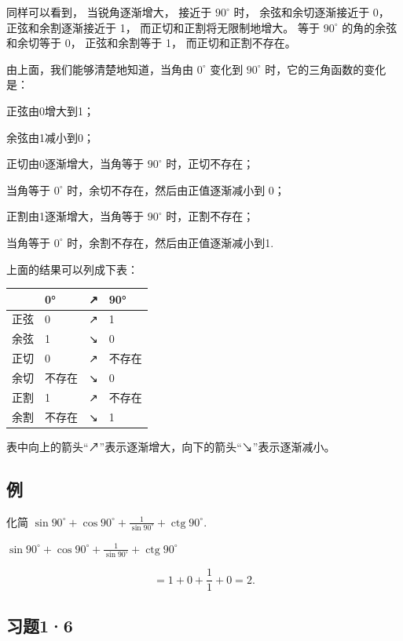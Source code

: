 同样可以看到， 当锐角逐渐增大， 接近于 \(90^{\circ}\) 时，
余弦和余切逐渐接近于 0， 正弦和余割逐渐接近于 1，
而正切和正割将无限制地增大。 等于 \(90^{\circ}\) 的角的余弦和余切等于
0， 正弦和余割等于 1， 而正切和正割不存在。

由上面，我们能够清楚地知道，当角由 \(0^{\circ}\) 变化到 \(90^{\circ}\)
时，它的三角函数的变化是：

正弦由0增大到1；

余弦由1减小到0；

正切由0逐渐增大，当角等于 \(90^{\circ}\) 时，正切不存在；

当角等于 \(0^{\circ}\) 时，余切不存在，然后由正值逐渐减小到 0；

正割由1逐渐增大，当角等于 \(90^{\circ}\) 时，正割不存在；

当角等于 \(0^{\circ}\) 时，余割不存在，然后由正值逐渐减小到1.

上面的结果可以列成下表：

{\def\LTcaptype{none} %
\begin{longtable}[]{@{}llll@{}}
\toprule\noalign{}
& 0° & ↗ & 90° \\
\midrule\noalign{}
\endhead
\bottomrule\noalign{}
\endlastfoot
正弦 & 0 & ↗ & 1 \\
余弦 & 1 & ↘ & 0 \\
正切 & 0 & ↗ & 不存在 \\
余切 & 不存在 & ↘ & 0 \\
正割 & 1 & ↗ & 不存在 \\
余割 & 不存在 & ↘ & 1 \\
\end{longtable}
}

表中向上的箭头``↗''表示逐渐增大，向下的箭头``↘''表示逐渐减小。

\subsection{例}

化简
\(\sin 90^{\circ} + \cos 90^{\circ} + \frac{1}{\sin 90^{\circ}} + \operatorname{ctg} 90^{\circ}\).

\(\sin 90^{\circ} + \cos 90^{\circ} + \frac{1}{\sin 90^{\circ}} + \operatorname{ctg}90^{\circ}\)

\[
= 1 + 0 + \frac {1}{1} + 0 = 2.
\]

\subsection{习题1·6}

